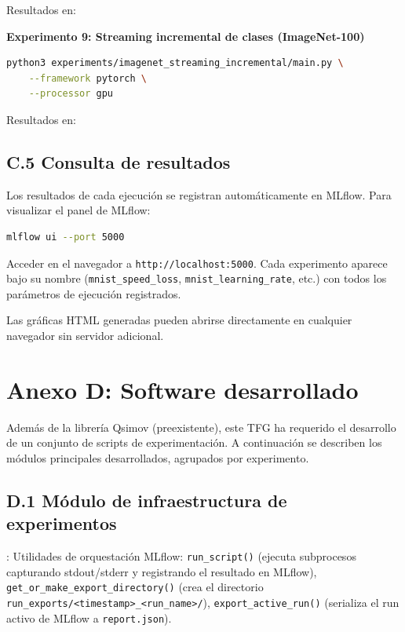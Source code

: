 Resultados en: 

\textbf{Experimento 9: Streaming incremental de clases (ImageNet-100)}

\begin{lstlisting}[language=bash]
python3 experiments/imagenet_streaming_incremental/main.py \
    --framework pytorch \
    --processor gpu
\end{lstlisting}

Resultados en: 

\subsection{C.5 Consulta de resultados}

Los resultados de cada ejecución se registran automáticamente en MLflow. Para visualizar el panel de
MLflow:

\begin{lstlisting}[language=bash]
mlflow ui --port 5000
\end{lstlisting}

Acceder en el navegador a \texttt{http://localhost:5000}. Cada experimento aparece bajo su nombre
(\texttt{mnist\_speed\_loss}, \texttt{mnist\_learning\_rate}, etc.) con todos los parámetros de
ejecución registrados.

Las gráficas HTML generadas pueden abrirse directamente en cualquier navegador sin servidor
adicional.

\section{Anexo D: Software desarrollado}

Además de la librería Qsimov (preexistente), este TFG ha requerido el desarrollo de un conjunto de
scripts de experimentación. A continuación se describen los módulos principales desarrollados,
agrupados por experimento.

\subsection{D.1 Módulo de infraestructura de experimentos}

: Utilidades de orquestación
MLflow: \texttt{run\_script()} (ejecuta subprocesos capturando stdout/stderr y registrando el
resultado en MLflow), \texttt{get\_or\_make\_export\_directory()} (crea el directorio
\texttt{run\_exports/<timestamp>\_<run\_name>/}), \texttt{export\_active\_run()} (serializa el
run activo de MLflow a \texttt{report.json}).

